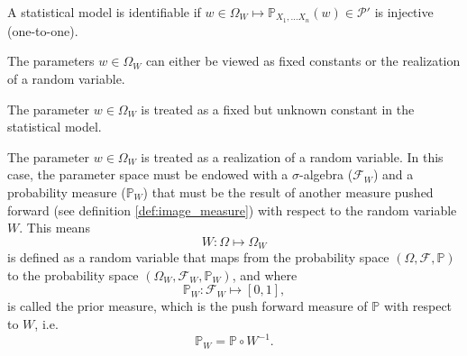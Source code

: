 \begin{definition}
	A statistical model is identifiable if $w\in \Omega_W \mapsto \mathbb{P}_{X_1,\dots X_n}(w)\in \mathcal{P}'$ is injective (one-to-one).
\end{definition}

The parameters $w\in \Omega_W$ can either be viewed as fixed constants or the realization of a random variable.
\begin{axiom}
	\label{ax:parameter_fixed}
	The parameter $w\in \Omega_W$ is treated as a fixed but unknown constant in the statistical model.
\end{axiom}
\begin{axiom}
	\label{ax:parameter_variable}
	The parameter $w\in \Omega_W$ is treated as a realization of a random variable. In this case, the parameter space must be endowed with a $\sigma$-algebra ($\mathcal{F}_W$) and a probability measure ($\mathbb{P}_W$) that must be the result of another measure pushed forward (see definition \ref{def:image_measure}) with respect to the random variable $W$. This means
	\begin{equation}
		W: \Omega \mapsto \Omega_W
	\end{equation}
	is defined as a random variable that maps from the probability space $(\Omega, \mathcal{F}, \mathbb{P})$ to the probability space $(\Omega_W,\mathcal{F}_W,\mathbb{P}_W)$, and where
	\begin{equation}
		\mathbb{P}_W: \mathcal{F}_W \mapsto [0,1],
	\end{equation}
	is called the prior measure, which is the push forward measure of $\mathbb{P}$ with respect to $W$, i.e.
	\begin{equation}
		\mathbb{P}_W = \mathbb{P}\circ W^{-1}.
	\end{equation}
\end{axiom}

